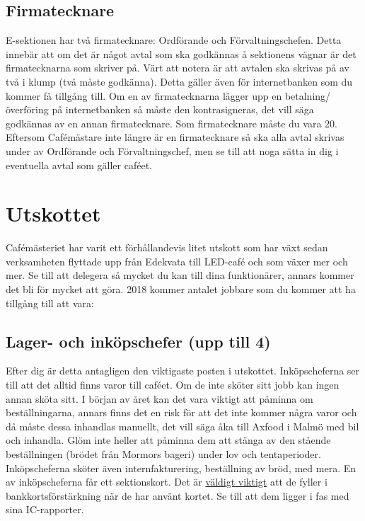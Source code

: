 \documentclass[10pt]{article}
\begin{document}
\subsection{Firmatecknare}
E-sektionen har två firmatecknare: Ordförande och Förvaltningschefen. Detta innebär att om det är något avtal som ska godkännas å sektionens vägnar är det firmatecknarna som skriver på. Värt att notera är att avtalen ska skrivas på av två i klump (två måste godkänna). Detta gäller även för internetbanken som du kommer få tillgång till. Om en av firmatecknarna lägger upp en betalning/överföring på internetbanken så måste den kontrasigneras, det vill säga godkännas av en annan firmatecknare. Som firmatecknare måste du vara 20. Eftersom Cafémästare inte längre är en firmatecknare så ska alla avtal skrivas under av Ordförande och Förvaltningschef, men se till att noga sätta in dig i eventuella avtal som gäller caféet.

\section{Utskottet}

Cafémästeriet har varit ett förhållandevis litet utskott som har växt sedan verksamheten flyttade upp från Edekvata till LED-café och som växer mer och mer. Se till att delegera så mycket du kan till dina funktionärer, annars kommer det bli för mycket att göra. 2018 kommer antalet jobbare som du kommer att ha tillgång till att vara:

\subsection{Lager- och inköpschefer (upp till 4)}
Efter dig är detta antagligen den viktigaste posten i utskottet. Inköpscheferna ser till att det alltid finns varor till caféet. Om de inte sköter sitt jobb kan ingen annan sköta sitt. I början av året kan det vara viktigt att påminna om beställningarna, annars finns det en risk för att det inte kommer några varor och då måste dessa inhandlas manuellt, det vill säga åka till Axfood i Malmö med bil och inhandla. Glöm inte heller att påminna dem att stänga av den stående beställningen (brödet från Mormors bageri) under lov och tentaperioder. Inköpscheferna sköter även internfakturering, beställning av bröd, med mera. En av inköpscheferna får ett sektionskort. Det är \underline{väldigt viktigt} att de fyller i bankkortsförstärkning när de har använt kortet. Se till att dem ligger i fas med sina IC-rapporter.
\end{document}
